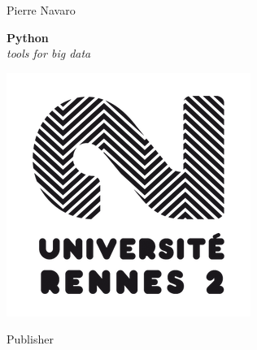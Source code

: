 
\vspace*{\baselineskip} 

\centering  
{\Large Pierre Navaro}
\vspace*{0.167\textheight} 

\raggedleft
\textbf{\textcolor{pythonblue}{\fontsize{50}{60}\selectfont Python}}\\[\baselineskip]  
\textcolor{pythonyellow}{\fontsize{30}{36}\selectfont \textit{tools for big data}}

\vspace*{0.1\textheight} 

\centering
\includegraphics{images/logoR2-Noir.png}

\vfill 

{\large Publisher} 
